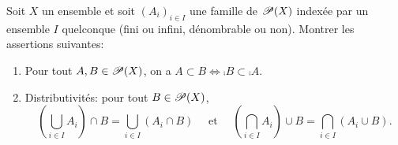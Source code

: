 \begin{td-exo}
    Soit \(X\) un ensemble et soit \({(A_i)}_{i\in I}\) une famille de \(\mathscr{P}(X)\)
    indexée par un ensemble \(I\) quelconque (fini ou infini, dénombrable ou non).
    Montrer les assertions suivantes:
    \begin{enumerate}
        \item Pour tout \(A,B\in\mathscr{P}(X)\), on a 
        \(A\subset B \Leftrightarrow \comp{B} \subset \comp{A}\).
        \item Distributivités: pour tout \(B\in\mathscr{P}(X)\), 
            \begin{equation*}
                \left(\bigcup_{i\in I}A_i\right)\cap B = \bigcup_{i\in I}(A_i\cap B)
                \quad\text{ et }\quad
                \left(\bigcap_{i\in I}A_i\right)\cup B = \bigcap_{i\in I}(A_i\cup B).
            \end{equation*}
    \end{enumerate}
\end{td-exo}
